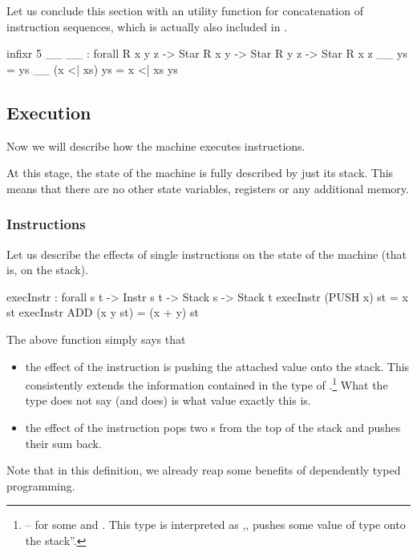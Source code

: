Let us conclude this section with an utility function for concatenation of
instruction sequences, which is actually also included in .

\begin{code}
  infixr 5 _\app_
  _\app_ : forall {R x y z} -> Star R x y -> Star R y z -> Star R x z
  _\app_ \nil ys = ys
  _\app_ (x <| xs) ys = x <| xs \app ys
\end{code}

\subsection{Execution}

Now we will describe how the machine executes instructions.

At this stage, the state of the machine is fully described by just its stack. This
means that there are no other state variables, registers or any additional
memory.

\subsubsection{Instructions}

Let us describe the effects of single instructions on the state of the machine
(that is, on the stack).

\begin{code}
  execInstr : forall {s t} -> Instr s t -> Stack s -> Stack t
  execInstr (PUSH x) st = x \scons st
  execInstr ADD (x \scons y \scons st) = (x + y) \scons st
\end{code}

\noindent The above function simply says that
\begin{itemize}
  \item the effect of the instruction  is pushing the attached
    value onto the stack. This consistently extends the information contained
    in the type of .\footnote{ -- for
    some  and . This type is interpreted as ,,
    pushes some value of type  onto the stack''.}
    What the type does not say (and 
    does) is what value exactly this is.
  \item the effect of the instruction  pops two s from
    the top of the stack and pushes their sum back.
\end{itemize}

Note that in this definition, we already reap some benefits of dependently
typed programming.


